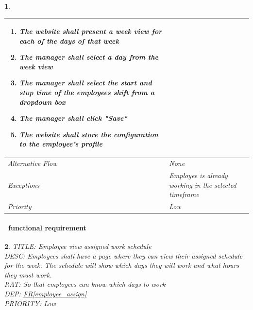 \documentclass{scrreprt}
\theoremstyle{funreq}
\newtheorem{funreq}{}
\newcommand*{\reqref}[1]{\hyperref[#1]{FR\ref*{#1}}}
\begin{document}
\begin{funreq}
\begin{table}[H]
{\begin{tabularx}{\columnwidth}{|l|X|}
\begin{enumerate}
    					\item The website shall present a week view for each of the days of that week
    					\item The manager shall select a day from the week view
    					\item The manager shall select the start and stop time of the employees shift from a dropdown box
    					\item The manager shall click "Save"
    					\item The website shall store the configuration to the employee's profile
					\end{enumerate}
					\\ \hline Alternative Flow & 
					None
					\\ \hline Exceptions & 
					Employee is already working in the selected timeframe
					\\ \hline Priority & 
					Low
					\\ \hline
				\end{tabularx}%
			}
		\end{table}
	\end{funreq}
	
	\paragraph[]{\Subsectionname ~functional requirement }
	\begin{funreq}
		\label{employee_viewwork}
		TITLE: Employee view assigned work schedule\\
		DESC: Employees shall have a page where they can view their assigned schedule for the week.  The schedule will show which days they will work and what hours they must work.\\
		RAT: So that employees can know which days to work\\
		DEP: \reqref{employee_assign}\\
		PRIORITY: Low\\
	\end{funreq}
	
\end{document}
